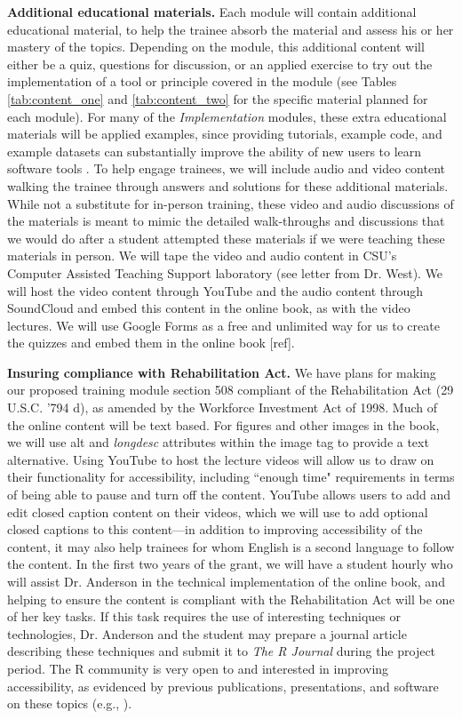 \documentclass[pdftex,english,11pt,parskip=half]{scrartcl}
\begin{document}
\textbf{Additional educational materials.} Each module will contain additional
educational material, to help the trainee absorb the material and assess his or
her mastery of the topics. Depending on the module, this additional content will
either be a quiz, questions for discussion, or an applied exercise to try out
the implementation of a tool or principle covered in the module (see Tables
\ref{tab:content_one} and \ref{tab:content_two} for the specific material
planned for each module). For many of the \textit{Implementation} modules, these extra educational materials will be applied examples, since providing tutorials, example code, and example datasets can substantially improve the ability of new users to learn software tools \cite{list2017ten}. To help engage trainees, we will include audio and
video content walking the trainee through answers and solutions for these
additional materials. While not a substitute for in-person training, these video
and audio discussions of the materials is meant to mimic the detailed
walk-throughs and discussions that we would do after a student attempted these
materials if we were teaching these materials in person. We will tape the video
and audio content in CSU's Computer Assisted Teaching Support laboratory (see
letter from Dr. West). We will host the video content through YouTube and the
audio content through SoundCloud and embed this content in the online book, as
with the video lectures. We will use Google Forms as a free and unlimited way
for us to create the quizzes and embed them in the online book [ref].

\noindent \textbf{Insuring compliance with Rehabilitation Act.} We have plans
for making our proposed training module section 508 compliant of the
Rehabilitation Act (29 U.S.C. '794 d), as amended by the Workforce Investment
Act of 1998. Much of the online content will be text based. For figures and
other images in the book, we will use alt and \textit{longdesc} attributes
within the image tag to provide a text alternative. Using YouTube to host the
lecture videos will allow us to draw on their functionality for accessibility,
including ``enough time" requirements in terms of being able to pause and turn
off the content. YouTube allows users to add and edit closed caption content on
their videos, which we will use to add optional closed captions to this
content---in addition to improving accessibility of the content, it may also
help trainees for whom English is a second language to follow the content. In
the first two years of the grant, we will have a student hourly who will assist
Dr. Anderson in the technical implementation of the online book, and helping to
ensure the content is compliant with the Rehabilitation Act will be one of her
key tasks. If this task requires the use of interesting techniques or
technologies, Dr. Anderson and the student may prepare a journal article
describing these techniques and submit it to \textit{The R Journal} during the
project period. The R community is very open to and interested in improving
accessibility, as evidenced by previous publications, presentations, and
software on these topics (e.g., \cite{uswebr, godfrey2013statistical}).
\end{document}
